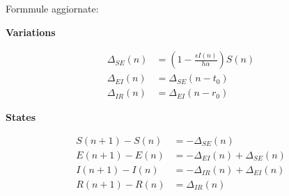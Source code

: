 \documentclass{article}
\theoremstyle{definition}
\theoremstyle{plain}
\theoremstyle{plain}
\begin{document}
Formmule aggiornate:

\textbf{Variations}

\begin{align}
\Delta_{SE}(n) & =  \left ( 1- \frac{s I(n)}{h \alpha}  \right ) S(n) \\
   \Delta_{EI}(n) & =  \Delta_{SE}(n-t_0)\\
   \Delta_{IR}(n) & =  \Delta_{EI}(n-r_0) 
\end{align}

\textbf{States}

\begin{align}
    S(n+1) - S(n) & = - \Delta_{SE}(n) \\
    E(n+1) - E(n) & = - \Delta_{EI}(n) + \Delta_{SE}(n) \\
    I(n+1)-I(n) & = - \Delta_{IR}(n) + \Delta_{EI}(n) \\
    R(n+1)-R(n) & = \Delta_{IR}(n) 
\end{align}
\end{document}
